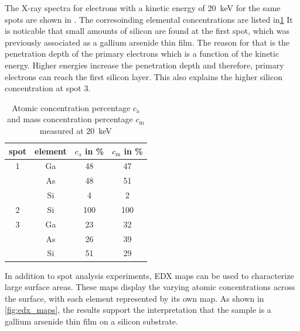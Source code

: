 The X-ray spectra for electrons with a kinetic energy of
\qty{20}{\kilo \electronvolt} for the same spots are shown
in .
The corresoinding elemental concentrations are listed in\cref{tab:edx_2}
It is noticable that small amounts of silicon are found at the first spot,
which was previously associated as a gallium arsenide thin film.
The reason for that is the penetration depth of the primary electrons which is
a function of the kinetic energy.
Higher energies increase the penetration depth and therefore, primary electrons
can reach the first silicon layer.
This also explains the higher silicon concentration at spot 3.

\begin{table}
	\centering
	\begin{tabular}{cccc}
		\toprule
		spot & element & $c_\mathrm{a}$ in \unit{\percent } & $c_\mathrm{m}$ in \unit{\percent} \\
		\midrule
		1    & Ga      & 48                                 & 47                                \\
		     & As      & 48                                 & 51                                \\
		     & Si      & 4                                  & 2                                 \\
		\midrule
		2    & Si      & 100                                & 100                               \\
		\midrule
		3    & Ga      & 23                                 & 32                                \\
		     & As      & 26                                 & 39                                \\
		     & Si      & 51                                 & 29                                \\
		\bottomrule
	\end{tabular}
	\caption{Atomic concentration percentage $c_\mathrm{a}$ and mass
		concentration percentage $c_\mathrm{m}$ measured at \qty{20}{\kilo\electronvolt}}
	\label{tab:edx_2}
\end{table}

In addition to spot analysis experiments, EDX maps can be used to
characterize large surface areas.
These maps display the varying atomic concentrations across the
surface, with each element represented by its own map.
As shown in \cref{fig:edx_maps}, the results support the
interpretation that the sample is a gallium arsenide thin film
on a silicon substrate.


